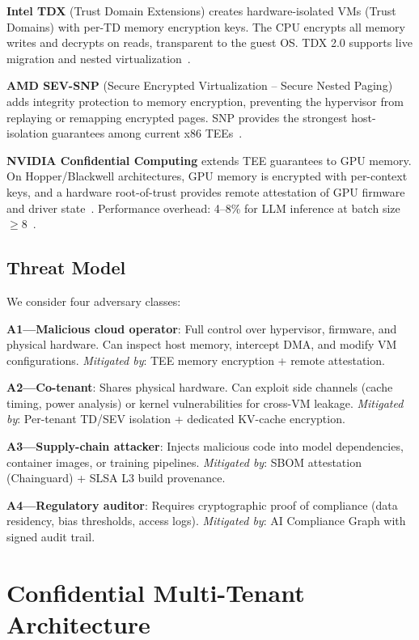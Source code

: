 \documentclass[conference,10pt]{IEEEtran}
\begin{document}
\textbf{Intel TDX} (Trust Domain Extensions) creates hardware-isolated VMs (Trust Domains) with per-TD memory encryption keys. The CPU encrypts all memory writes and decrypts on reads, transparent to the guest OS. TDX 2.0 supports live migration and nested virtualization~\cite{intel2024tdx}.

\textbf{AMD SEV-SNP} (Secure Encrypted Virtualization -- Secure Nested Paging) adds integrity protection to memory encryption, preventing the hypervisor from replaying or remapping encrypted pages. SNP provides the strongest host-isolation guarantees among current x86 TEEs~\cite{amd2024sevsnp}.

\textbf{NVIDIA Confidential Computing} extends TEE guarantees to GPU memory. On Hopper/Blackwell architectures, GPU memory is encrypted with per-context keys, and a hardware root-of-trust provides remote attestation of GPU firmware and driver state~\cite{nvidia2024ccmode}. Performance overhead: 4--8\% for LLM inference at batch size $\geq$8~\cite{hunt2024confidential}.

\subsection{Threat Model}

We consider four adversary classes:

\textbf{A1---Malicious cloud operator}: Full control over hypervisor, firmware, and physical hardware. Can inspect host memory, intercept DMA, and modify VM configurations. \emph{Mitigated by}: TEE memory encryption + remote attestation.

\textbf{A2---Co-tenant}: Shares physical hardware. Can exploit side channels (cache timing, power analysis) or kernel vulnerabilities for cross-VM leakage. \emph{Mitigated by}: Per-tenant TD/SEV isolation + dedicated KV-cache encryption.

\textbf{A3---Supply-chain attacker}: Injects malicious code into model dependencies, container images, or training pipelines. \emph{Mitigated by}: SBOM attestation (Chainguard) + SLSA L3 build provenance.

\textbf{A4---Regulatory auditor}: Requires cryptographic proof of compliance (data residency, bias thresholds, access logs). \emph{Mitigated by}: AI Compliance Graph with signed audit trail.

\section{Confidential Multi-Tenant Architecture}
\label{sec:arch}
\end{document}
